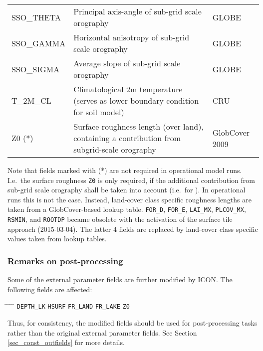 \begin{longtable}{p{2.5cm}p{8.5cm}p{3.3cm}}
  SSO\_THETA                            & Principal axis-angle of sub-grid scale orography &          GLOBE           \\
  SSO\_GAMMA                            & Horizontal anisotropy of sub-grid scale orography &         GLOBE           \\
  SSO\_SIGMA                            & Average slope of sub-grid scale orography       &           GLOBE           \\
  T\_2M\_CL                             & Climatological 2m temperature (serves as lower boundary condition for soil model)  &  CRU \\
  Z0 (*)                                & Surface roughness length (over land), containing a contribution from subgrid-scale orography  & GlobCover 2009    \\                        
  \bottomrule
\end{longtable}

Note that fields marked with (*) are not required in operational model runs. I.e.\ the surface roughness \texttt{Z0} is only required, 
if the additional contribution from sub-grid scale orography shall be taken into account (i.e.\ for ). In operational runs 
this is not the case. Instead, land-cover class specific roughness lengths are taken from a GlobCover-based lookup table. 
\texttt{FOR\_D}, \texttt{FOR\_E}, \texttt{LAI\_MX}, \texttt{PLCOV\_MX}, 
\texttt{RSMIN}, and \texttt{ROOTDP} became obsolete with the activation of the surface tile approach (2015-03-04). The latter $4$ fields 
are replaced by land-cover class specific values taken from lookup tables.



\subsubsection*{Remarks on post-processing}
Some of the external parameter fields are further modified by ICON. The following fields are affected: 
\begin{tabbing}
\hspace{0.20\textwidth} \= \hspace{0.20\textwidth} \= \hspace{0.20\textwidth} \= \hspace{0.20\textwidth} \= \hspace{0.20\textwidth} \kill
\texttt{DEPTH\_LK}  \>
\texttt{HSURF} \>
\texttt{FR\_LAND} \>
\texttt{FR\_LAKE} \>
\texttt{Z0}
\end{tabbing}
Thus, for consistency, the modified fields should be used for post-processing tasks rather than the original external parameter fields. 
See Section \ref{sec_const_outfields} for more details.
